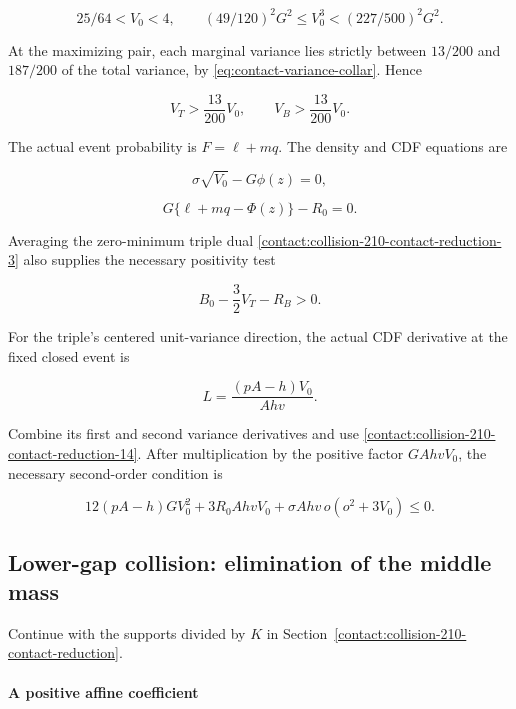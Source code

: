 \[
 25/64<V_0<4,\qquad
 (49/120)^2G^2\le V_0^3<(227/500)^2G^2.
\tag{B.16.12}\label{contact:collision-210-contact-reduction-12}
\]

At the maximizing pair, each marginal variance lies strictly between
$13/200$ and $187/200$ of the total variance, by
\eqref{eq:contact-variance-collar}. Hence

\[
 V_T>\frac{13}{200}V_0,\qquad
 V_B>\frac{13}{200}V_0.
\tag{B.16.13}\label{contact:collision-210-contact-reduction-13}
\]

The actual event probability is $F=\ell+mq$. The density and CDF equations
are

\[
 \boxed{\quad \sigma\sqrt{V_0}-G\phi(z)=0,\quad}
\tag{B.16.14}\label{contact:collision-210-contact-reduction-14}
\]

\[
 \boxed{\quad G\{\ell+mq-\Phi(z)\}-R_0=0.\quad}
\tag{B.16.15}\label{contact:collision-210-contact-reduction-15}
\]

Averaging the zero-minimum triple dual \eqref{contact:collision-210-contact-reduction-3} also supplies the necessary
positivity test

\[
 \boxed{\quad B_0-\frac32V_T-R_B>0.\quad}
\tag{B.16.16}\label{contact:collision-210-contact-reduction-16}
\]

For the triple's centered unit-variance direction, the actual CDF
derivative at the fixed closed event is

\[
 L=\frac{(pA-h)V_0}{Ahv}.
\]

Combine its first and second variance derivatives and use \eqref{contact:collision-210-contact-reduction-14}. After
multiplication by the positive factor $G A h v V_0$, the necessary
second-order condition is

\[
 \boxed{\quad
 12(pA-h)GV_0^2+3R_0AhvV_0
       +\sigma Ahv\,o(o^2+3V_0)\leq0.
 \quad}
\tag{B.16.17}\label{contact:collision-210-contact-reduction-17}
\]

\subsection{Lower-gap collision: elimination of the middle mass}\label{contact:collision-210-mass-elimination}
Continue with the supports divided by $K$ in Section~\ref{contact:collision-210-contact-reduction}.



\paragraph{A positive affine coefficient}

